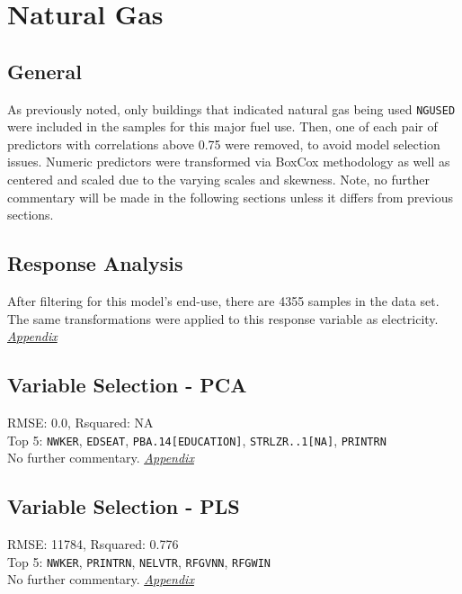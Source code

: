\section*{Natural Gas}
\label{sec:natural_gas}

\subsection{General}
As previously noted, only buildings that indicated natural gas being used \lstinline{NGUSED} were included in the samples for this major fuel use.  Then, one of each pair of predictors with correlations above 0.75 were removed, to avoid model selection issues. Numeric predictors were transformed via BoxCox methodology as well as centered and scaled due to the varying scales and skewness.  Note, no further commentary will be made in the following sections unless it differs from previous sections.

\subsection{Response Analysis}

After filtering for this model's end-use, there are 4355 samples in the data set.  The same transformations were applied to this response variable as electricity. \textit{\hyperref[appendix:natural_gas:response]{Appendix}}

\subsection{Variable Selection - PCA}
RMSE: 0.0, Rsquared: NA\\
Top 5: \lstinline{NWKER}, \lstinline{EDSEAT}, \lstinline{PBA.14[EDUCATION]}, \lstinline{STRLZR..1[NA]}, \lstinline{PRINTRN}
\\[0.1in]
\indent No further commentary.  \textit{\hyperref[appendix:natural_gas:pca]{Appendix}}

\subsection{Variable Selection - PLS}
RMSE: 11784, Rsquared: 0.776\\
Top 5: \lstinline{NWKER}, \lstinline{PRINTRN}, \lstinline{NELVTR}, \lstinline{RFGVNN}, \lstinline{RFGWIN}
\\[0.1in]
\indent No further commentary.  \textit{\hyperref[appendix:natural_gas:pls]{Appendix}}